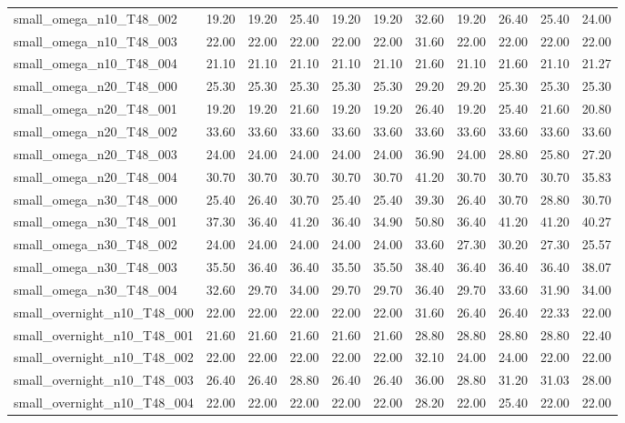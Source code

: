\begin{table}[htbp]
\begin{tabular}{lrrrrrrrrrr}
small\_omega\_n10\_T48\_002 & 19.20 & 19.20 & 25.40 & 19.20 & 19.20 & 32.60 & 19.20 & 26.40 & 25.40 & 24.00 \\
small\_omega\_n10\_T48\_003 & 22.00 & 22.00 & 22.00 & 22.00 & 22.00 & 31.60 & 22.00 & 22.00 & 22.00 & 22.00 \\
small\_omega\_n10\_T48\_004 & 21.10 & 21.10 & 21.10 & 21.10 & 21.10 & 21.60 & 21.10 & 21.60 & 21.10 & 21.27 \\
small\_omega\_n20\_T48\_000 & 25.30 & 25.30 & 25.30 & 25.30 & 25.30 & 29.20 & 29.20 & 25.30 & 25.30 & 25.30 \\
small\_omega\_n20\_T48\_001 & 19.20 & 19.20 & 21.60 & 19.20 & 19.20 & 26.40 & 19.20 & 25.40 & 21.60 & 20.80 \\
small\_omega\_n20\_T48\_002 & 33.60 & 33.60 & 33.60 & 33.60 & 33.60 & 33.60 & 33.60 & 33.60 & 33.60 & 33.60 \\
small\_omega\_n20\_T48\_003 & 24.00 & 24.00 & 24.00 & 24.00 & 24.00 & 36.90 & 24.00 & 28.80 & 25.80 & 27.20 \\
small\_omega\_n20\_T48\_004 & 30.70 & 30.70 & 30.70 & 30.70 & 30.70 & 41.20 & 30.70 & 30.70 & 30.70 & 35.83 \\
small\_omega\_n30\_T48\_000 & 25.40 & 26.40 & 30.70 & 25.40 & 25.40 & 39.30 & 26.40 & 30.70 & 28.80 & 30.70 \\
small\_omega\_n30\_T48\_001 & 37.30 & 36.40 & 41.20 & 36.40 & 34.90 & 50.80 & 36.40 & 41.20 & 41.20 & 40.27 \\
small\_omega\_n30\_T48\_002 & 24.00 & 24.00 & 24.00 & 24.00 & 24.00 & 33.60 & 27.30 & 30.20 & 27.30 & 25.57 \\
small\_omega\_n30\_T48\_003 & 35.50 & 36.40 & 36.40 & 35.50 & 35.50 & 38.40 & 36.40 & 36.40 & 36.40 & 38.07 \\
small\_omega\_n30\_T48\_004 & 32.60 & 29.70 & 34.00 & 29.70 & 29.70 & 36.40 & 29.70 & 33.60 & 31.90 & 34.00 \\
small\_overnight\_n10\_T48\_000 & 22.00 & 22.00 & 22.00 & 22.00 & 22.00 & 31.60 & 26.40 & 26.40 & 22.33 & 22.00 \\
small\_overnight\_n10\_T48\_001 & 21.60 & 21.60 & 21.60 & 21.60 & 21.60 & 28.80 & 28.80 & 28.80 & 28.80 & 22.40 \\
small\_overnight\_n10\_T48\_002 & 22.00 & 22.00 & 22.00 & 22.00 & 22.00 & 32.10 & 24.00 & 24.00 & 22.00 & 22.00 \\
small\_overnight\_n10\_T48\_003 & 26.40 & 26.40 & 28.80 & 26.40 & 26.40 & 36.00 & 28.80 & 31.20 & 31.03 & 28.00 \\
small\_overnight\_n10\_T48\_004 & 22.00 & 22.00 & 22.00 & 22.00 & 22.00 & 28.20 & 22.00 & 25.40 & 22.00 & 22.00 \\

\end{tabular}
\end{table}

